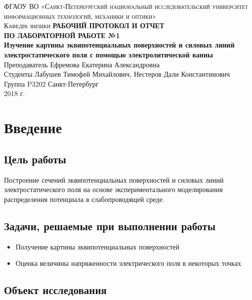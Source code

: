 \documentclass[12pt, a4paper]{article}
\begin{document}
\begin{titlepage}

\noindent\textsc{ФГАОУ ВО «Санкт-Петербургский национальный исследовательский
университет информационных технологий, механики и оптики»\\[4mm]
Кафедра физики}
\vfill
\noindent\textbf{РАБОЧИЙ ПРОТОКОЛ И ОТЧЕТ\\[2mm]
ПО ЛАБОРАТОРНОЙ РАБОТЕ №1\\[4mm]
Изучение картины эквипотенциальных поверхностей и силовых линий
электростатического поля с помощью электролитической ванны }\\[16mm]
Преподаватель Ефремова Екатерина Александровна\\[2mm]
Студенты Лабушев Тимофей Михайлович, Нестеров Дали Константинович\\[2mm]
Группа P3202
\vfill
\noindent Санкт-Петербург\\[2mm]
2018 г.

\end{titlepage}

\section*{Введение}

\subsection*{Цель работы}

Построение сечений эквипотенциальных поверхностей и силовых линий
электростатического поля на основе экспериментального моделирования
распределения потенциала в слабопроводящей среде.

\subsection*{Задачи, решаемые при выполнении работы}

\begin{itemize}
\item Получение картины эквипотенциальных поверхностей
\item Оценка величины напряженности электрического поля в некоторых точках
\end{itemize}

\subsection*{Объект исследования}
\end{document}
